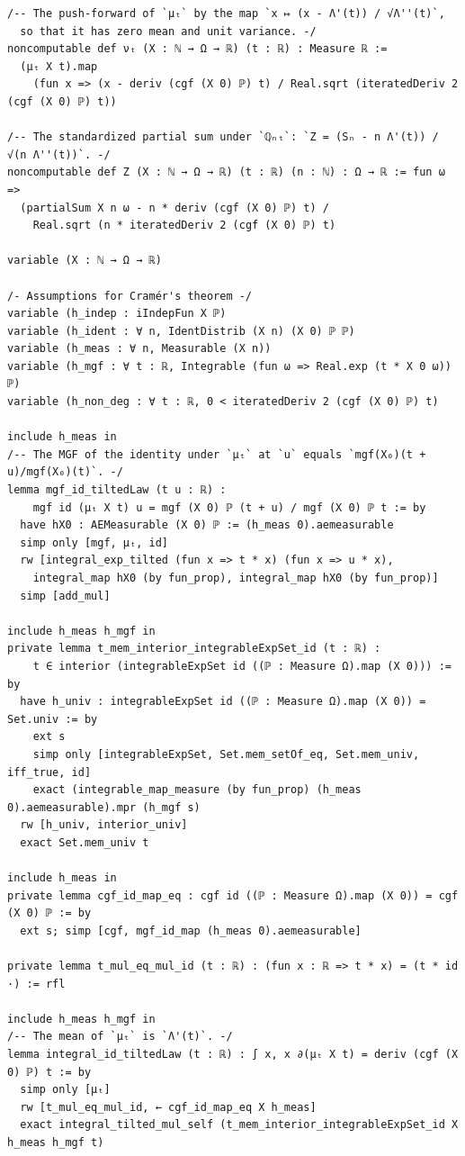 \newpage
\begin{lstlisting}
/-- The push-forward of `μₜ` by the map `x ↦ (x - Λ'(t)) / √Λ''(t)`,
  so that it has zero mean and unit variance. -/
noncomputable def νₜ (X : ℕ → Ω → ℝ) (t : ℝ) : Measure ℝ :=
  (μₜ X t).map
    (fun x => (x - deriv (cgf (X 0) ℙ) t) / Real.sqrt (iteratedDeriv 2 (cgf (X 0) ℙ) t))

/-- The standardized partial sum under `ℚₙₜ`: `Z = (Sₙ - n Λ'(t)) / √(n Λ''(t))`. -/
noncomputable def Z (X : ℕ → Ω → ℝ) (t : ℝ) (n : ℕ) : Ω → ℝ := fun ω =>
  (partialSum X n ω - n * deriv (cgf (X 0) ℙ) t) /
    Real.sqrt (n * iteratedDeriv 2 (cgf (X 0) ℙ) t)

variable (X : ℕ → Ω → ℝ)

/- Assumptions for Cramér's theorem -/
variable (h_indep : iIndepFun X ℙ)
variable (h_ident : ∀ n, IdentDistrib (X n) (X 0) ℙ ℙ)
variable (h_meas : ∀ n, Measurable (X n))
variable (h_mgf : ∀ t : ℝ, Integrable (fun ω => Real.exp (t * X 0 ω)) ℙ)
variable (h_non_deg : ∀ t : ℝ, 0 < iteratedDeriv 2 (cgf (X 0) ℙ) t)

include h_meas in
/-- The MGF of the identity under `μₜ` at `u` equals `mgf(X₀)(t + u)/mgf(X₀)(t)`. -/
lemma mgf_id_tiltedLaw (t u : ℝ) :
    mgf id (μₜ X t) u = mgf (X 0) ℙ (t + u) / mgf (X 0) ℙ t := by
  have hX0 : AEMeasurable (X 0) ℙ := (h_meas 0).aemeasurable
  simp only [mgf, μₜ, id]
  rw [integral_exp_tilted (fun x => t * x) (fun x => u * x),
    integral_map hX0 (by fun_prop), integral_map hX0 (by fun_prop)]
  simp [add_mul]

include h_meas h_mgf in
private lemma t_mem_interior_integrableExpSet_id (t : ℝ) :
    t ∈ interior (integrableExpSet id ((ℙ : Measure Ω).map (X 0))) := by
  have h_univ : integrableExpSet id ((ℙ : Measure Ω).map (X 0)) = Set.univ := by
    ext s
    simp only [integrableExpSet, Set.mem_setOf_eq, Set.mem_univ, iff_true, id]
    exact (integrable_map_measure (by fun_prop) (h_meas 0).aemeasurable).mpr (h_mgf s)
  rw [h_univ, interior_univ]
  exact Set.mem_univ t

include h_meas in
private lemma cgf_id_map_eq : cgf id ((ℙ : Measure Ω).map (X 0)) = cgf (X 0) ℙ := by
  ext s; simp [cgf, mgf_id_map (h_meas 0).aemeasurable]

private lemma t_mul_eq_mul_id (t : ℝ) : (fun x : ℝ => t * x) = (t * id ·) := rfl

include h_meas h_mgf in
/-- The mean of `μₜ` is `Λ'(t)`. -/
lemma integral_id_tiltedLaw (t : ℝ) : ∫ x, x ∂(μₜ X t) = deriv (cgf (X 0) ℙ) t := by
  simp only [μₜ]
  rw [t_mul_eq_mul_id, ← cgf_id_map_eq X h_meas]
  exact integral_tilted_mul_self (t_mem_interior_integrableExpSet_id X h_meas h_mgf t)

\end{lstlisting}
